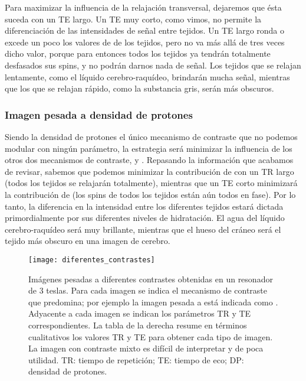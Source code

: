 Para maximizar la influencia de la relajación transversal, dejaremos que ésta suceda con un TE largo. Un TE muy corto, como vimos, no permite la diferenciación de las intensidades de señal entre tejidos. Un TE largo ronda o excede un poco los valores de \Ttwo de los tejidos, pero no va más allá de tres veces dicho valor, porque para entonces todos los tejidos ya tendrán totalmente desfasados sus spins, y no podrán darnos nada de señal. Los tejidos que se relajan lentamente, como el líquido cerebro-raquídeo, brindarán mucha señal, mientras que los que se relajan rápido, como la substancia gris, serán más obscuros.

\subsubsection{Imagen pesada a densidad de protones}
Siendo la densidad de protones el único mecanismo de contraste que no podemos modular con ningún parámetro, la estrategia será minimizar la influencia de los otros dos mecanismos de contraste, \Tone y \Ttwo. Repasando la información que acabamos de revisar, sabemos que podemos minimizar la contribución de \Tone con un TR largo (todos los tejidos se relajarán totalmente), mientras que un TE corto minimizará la contribución de \Ttwo (los spins de todos los tejidos están aún todos en fase). Por lo tanto, la diferencia en la intensidad entre los diferentes tejidos estará dictada primordialmente por sus diferentes niveles de hidratación. El agua del líquido cerebro-raquídeo será muy brillante, mientras que el hueso del cráneo será el tejido más obscuro en una imagen de cerebro.



\begin{figure}[htb]
\begin{figg}
   \texttt{[image: diferentes\_contrastes]}
   \caption{Imágenes pesadas a diferentes contrastes obtenidas en un resonador de 3 teslas. Para cada imagen se indica el mecanismo de contraste que predomina; por ejemplo la imagen pesada a \Tone está indicada como \Tone. Adyacente a cada imagen se indican los parámetros TR y TE correspondientes. La tabla de la derecha resume en términos cualitativos los valores TR y TE para obtener cada tipo de imagen. La imagen con contraste mixto es difícil de interpretar y de poca utilidad. TR: tiempo de repetición; TE: tiempo de eco; DP: densidad de protones.}
 \label{fig:diferentes_contrastes}
 \end{figg}
\end{figure}



